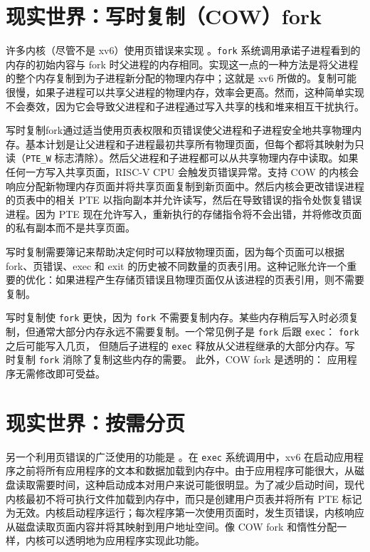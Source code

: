 \section{现实世界：写时复制（COW）fork}

许多内核（尽管不是 xv6）使用页错误来实现
。{\tt fork} 系统调用承诺子进程看到的内存的初始内容与 fork 时父进程的内存相同。实现这一点的一种方法是将父进程的整个内存复制到为子进程新分配的物理内存中；这就是 xv6 所做的。复制可能很慢，如果子进程可以共享父进程的物理内存，效率会更高。然而，这种简单实现不会奏效，因为它会导致父进程和子进程通过写入共享的栈和堆来相互干扰执行。

写时复制fork通过适当使用页表权限和页错误使父进程和子进程安全地共享物理内存。基本计划是让父进程和子进程最初共享所有物理页面，但每个都将其映射为只读（\lstinline{PTE_W} 标志清除）。然后父进程和子进程都可以从共享物理内存中读取。如果任何一方写入共享页面，RISC-V CPU 会触发页错误异常。支持 COW 的内核会响应分配新物理内存页面并将共享页面复制到新页面中。然后内核会更改错误进程的页表中的相关 PTE 以指向副本并允许读写，然后在导致错误的指令处恢复错误进程。因为 PTE 现在允许写入，重新执行的存储指令将不会出错，并将修改页面的私有副本而不是共享页面。

写时复制需要簿记来帮助决定何时可以释放物理页面，因为每个页面可以根据 fork、页错误、exec 和 exit 的历史被不同数量的页表引用。这种记账允许一个重要的优化：如果进程产生存储页错误且物理页面仅从该进程的页表引用，则不需要复制。

写时复制使 \lstinline{fork} 更快，因为 \lstinline{fork} 不需要复制内存。某些内存稍后写入时必须复制，但通常大部分内存永远不需要复制。一个常见例子是
\lstinline{fork} 后跟 \lstinline{exec}：
\lstinline{fork} 之后可能写入几页，
但随后子进程的 \lstinline{exec} 释放从父进程继承的大部分内存。写时复制 \lstinline{fork} 消除了复制这些内存的需要。
此外，COW fork 是透明的：
应用程序无需修改即可受益。

\section{现实世界：按需分页}

另一个利用页错误的广泛使用的功能是
。在 \lstinline{exec} 系统调用中，xv6 在启动应用程序之前将所有应用程序的文本和数据加载到内存中。由于应用程序可能很大，从磁盘读取需要时间，这种启动成本对用户来说可能很明显。为了减少启动时间，现代内核最初不将可执行文件加载到内存中，而只是创建用户页表并将所有 PTE 标记为无效。内核启动程序运行；每次程序第一次使用页面时，发生页错误，内核响应从磁盘读取页面内容并将其映射到用户地址空间。像 COW fork 和惰性分配一样，内核可以透明地为应用程序实现此功能。

